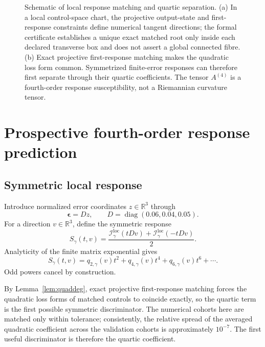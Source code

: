 \documentclass[11pt]{article}
\newcommand{\R}{\mathbb{R}}
\newcommand{\cI}{\mathcal{I}}
\begin{document}
\begin{figure}[t]
\caption{Schematic of local response matching and quartic separation.
(a) In a local control-space chart, the projective output-state and
first-response constraints define numerical tangent directions; the formal
certificate establishes a unique exact matched root only inside each declared
transverse box and does not assert a global connected fibre.
(b) Exact projective first-response matching makes the quadratic loss form
common. Symmetrized finite-error responses can therefore first separate
through their quartic coefficients. The tensor $A^{(4)}$ is a fourth-order
response susceptibility, not a Riemannian curvature tensor.}
\label{fig:quartic-schematic}
\end{figure}

\section{Prospective fourth-order response prediction}

\subsection{Symmetric local response}

Introduce normalized error coordinates $z\in\R^3$ through
\[
\boldsymbol{\epsilon}=Dz,\qquad
D=\operatorname{diag}(0.06,0.04,0.05).
\]
For a direction $v\in\R^3$, define the symmetric response
\begin{equation}
S_\gamma(t,v)
=
\frac{
\cI^{\mathrm{loc}}_\gamma(tDv)+
\cI^{\mathrm{loc}}_\gamma(-tDv)
}{2}.
\label{eq:symmetric}
\end{equation}
Analyticity of the finite matrix exponential gives
\begin{equation}
S_\gamma(t,v)
=
q_{2,\gamma}(v)t^2
+q_{4,\gamma}(v)t^4
+q_{6,\gamma}(v)t^6+\cdots.
\label{eq:jet}
\end{equation}
Odd powers cancel by construction.

By Lemma~\ref{lem:quaddeg}, exact projective first-response matching forces the quadratic loss forms of matched controls to coincide exactly, so the quartic term is the first possible symmetric discriminator. The numerical cohorts here are matched only within tolerance; consistently, the relative spread of the averaged quadratic coefficient across the validation cohorts is approximately $10^{-7}$. The first useful discriminator is therefore the quartic coefficient.
\end{document}
